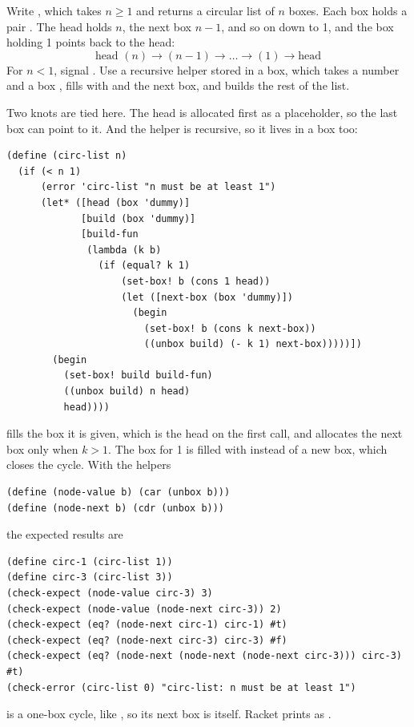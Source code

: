 \begin{exercise}
Write , which takes $n \ge 1$ and returns a circular list of $n$ boxes. Each box holds a pair . The head holds $n$, the next box $n - 1$, and so on down to 1, and the box holding 1 points back to the head:
\[
\text{head } (n) \to (n-1) \to \dots \to (1) \to \text{head}
\]
For $n < 1$, signal . Use a recursive helper stored in a box, which takes a number  and a box , fills  with  and the next box, and builds the rest of the list.
\end{exercise}
\begin{solution}
Two knots are tied here. The head is allocated first as a placeholder, so the last box can point to it. And the helper  is recursive, so it lives in a box too:
\begin{lstlisting}
(define (circ-list n)
  (if (< n 1)
      (error 'circ-list "n must be at least 1")
      (let* ([head (box 'dummy)]
             [build (box 'dummy)]
             [build-fun
              (lambda (k b)
                (if (equal? k 1)
                    (set-box! b (cons 1 head))
                    (let ([next-box (box 'dummy)])
                      (begin
                        (set-box! b (cons k next-box))
                        ((unbox build) (- k 1) next-box)))))])
        (begin
          (set-box! build build-fun)
          ((unbox build) n head)
          head))))
\end{lstlisting}
 fills the box it is given, which is the head on the first call, and allocates the next box only when $k > 1$. The box for 1 is filled with  instead of a new box, which closes the cycle. With the helpers
\begin{lstlisting}
(define (node-value b) (car (unbox b)))
(define (node-next b) (cdr (unbox b)))
\end{lstlisting}
the expected results are
\begin{lstlisting}
(define circ-1 (circ-list 1))
(define circ-3 (circ-list 3))
(check-expect (node-value circ-3) 3)
(check-expect (node-value (node-next circ-3)) 2)
(check-expect (eq? (node-next circ-1) circ-1) #t)
(check-expect (eq? (node-next circ-3) circ-3) #f)
(check-expect (eq? (node-next (node-next (node-next circ-3))) circ-3) #t)
(check-error (circ-list 0) "circ-list: n must be at least 1")
\end{lstlisting}
 is a one-box cycle, like , so its next box is itself. Racket prints  as .
\end{solution}


